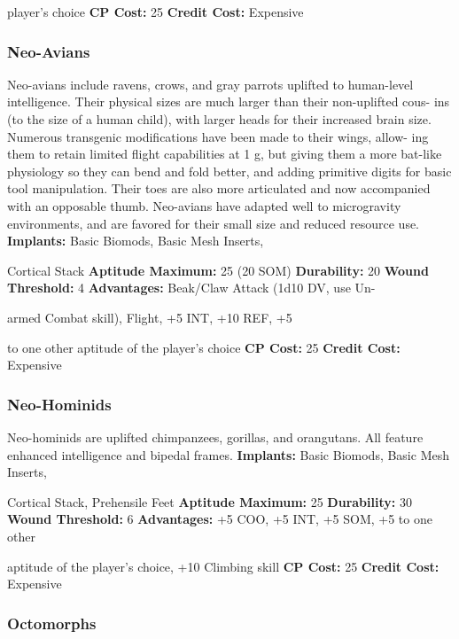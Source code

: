 player's choice
\textbf{CP Cost:} 25
\textbf{Credit Cost: }Expensive

\subsubsection{Neo-Avians}

Neo-avians include ravens, crows, and gray parrots 
uplifted to human-level intelligence. Their physical 
sizes are much larger than their non-uplifted cous-
ins (to the size of a human child), with larger heads 
for their increased brain size. Numerous transgenic 
modifications have been made to their wings, allow-
ing them to retain limited flight capabilities at 1 g, 
but giving them a more bat-like physiology so they 
can bend and fold better, and adding primitive digits 
for basic tool manipulation. Their toes are also more 
articulated and now accompanied with an opposable 
thumb. Neo-avians have adapted well to microgravity 
environments, and are favored for their small size and 
reduced resource use.
\textbf{Implants: }Basic Biomods, Basic Mesh Inserts, 

Cortical Stack
\textbf{Aptitude Maximum: }25 (20 SOM)
\textbf{Durability:} 20
\textbf{Wound Threshold:} 4
\textbf{Advantages:  }Beak/Claw Attack (1d10 DV, use Un-

armed Combat skill), Flight, +5 INT, +10 REF, +5 

to one other aptitude of the player's choice
\textbf{CP Cost:} 25
\textbf{Credit Cost: }Expensive

\subsubsection{Neo-Hominids}

Neo-hominids are uplifted chimpanzees, gorillas, and 
orangutans. All feature enhanced intelligence and 
bipedal frames.
\textbf{Implants: }Basic Biomods, Basic Mesh Inserts, 

Cortical Stack, Prehensile Feet
\textbf{Aptitude Maximum:} 25
\textbf{Durability:} 30
\textbf{Wound Threshold:} 6
\textbf{Advantages:} +5 COO, +5 INT, +5 SOM, +5 to one other 

aptitude of the player's choice, +10 Climbing skill
\textbf{CP Cost:} 25
\textbf{Credit Cost: }Expensive

\subsubsection{Octomorphs}

